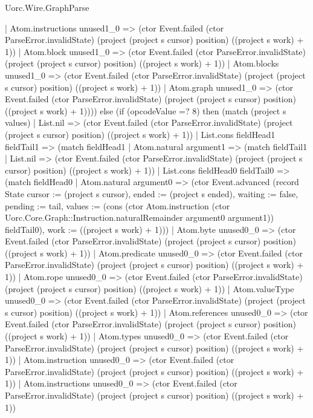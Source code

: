 \begin{lexlean}{Uorc.Wire.GraphParse}
\begin{semanticmodule}
{          | Atom.instructions unused1_0 => (ctor Event.failed (ctor ParseError.invalidState) (project (project s cursor) position) ((project s work) + 1))
          | Atom.block unused1_0 => (ctor Event.failed (ctor ParseError.invalidState) (project (project s cursor) position) ((project s work) + 1))
          | Atom.blocks unused1_0 => (ctor Event.failed (ctor ParseError.invalidState) (project (project s cursor) position) ((project s work) + 1))
          | Atom.graph unused1_0 => (ctor Event.failed (ctor ParseError.invalidState) (project (project s cursor) position) ((project s work) + 1)))) else (if (opcodeValue =? 8) then (match (project s values)
        | List.nil => (ctor Event.failed (ctor ParseError.invalidState) (project (project s cursor) position) ((project s work) + 1))
        | List.cons fieldHead1 fieldTail1 => (match fieldHead1
          | Atom.natural argument1 => (match fieldTail1
            | List.nil => (ctor Event.failed (ctor ParseError.invalidState) (project (project s cursor) position) ((project s work) + 1))
            | List.cons fieldHead0 fieldTail0 => (match fieldHead0
              | Atom.natural argument0 => (ctor Event.advanced (record State {cursor := (project s cursor), ended := (project s ended), waiting := false, pending := tail, values := (cons (ctor Atom.instruction (ctor Uorc.Core.Graph::Instruction.naturalRemainder argument0 argument1)) fieldTail0), work := ((project s work) + 1)}))
              | Atom.byte unused0_0 => (ctor Event.failed (ctor ParseError.invalidState) (project (project s cursor) position) ((project s work) + 1))
              | Atom.predicate unused0_0 => (ctor Event.failed (ctor ParseError.invalidState) (project (project s cursor) position) ((project s work) + 1))
              | Atom.rope unused0_0 => (ctor Event.failed (ctor ParseError.invalidState) (project (project s cursor) position) ((project s work) + 1))
              | Atom.valueType unused0_0 => (ctor Event.failed (ctor ParseError.invalidState) (project (project s cursor) position) ((project s work) + 1))
              | Atom.references unused0_0 => (ctor Event.failed (ctor ParseError.invalidState) (project (project s cursor) position) ((project s work) + 1))
              | Atom.types unused0_0 => (ctor Event.failed (ctor ParseError.invalidState) (project (project s cursor) position) ((project s work) + 1))
              | Atom.instruction unused0_0 => (ctor Event.failed (ctor ParseError.invalidState) (project (project s cursor) position) ((project s work) + 1))
              | Atom.instructions unused0_0 => (ctor Event.failed (ctor ParseError.invalidState) (project (project s cursor) position) ((project s work) + 1))
}
\end{semanticmodule}
\end{lexlean}
